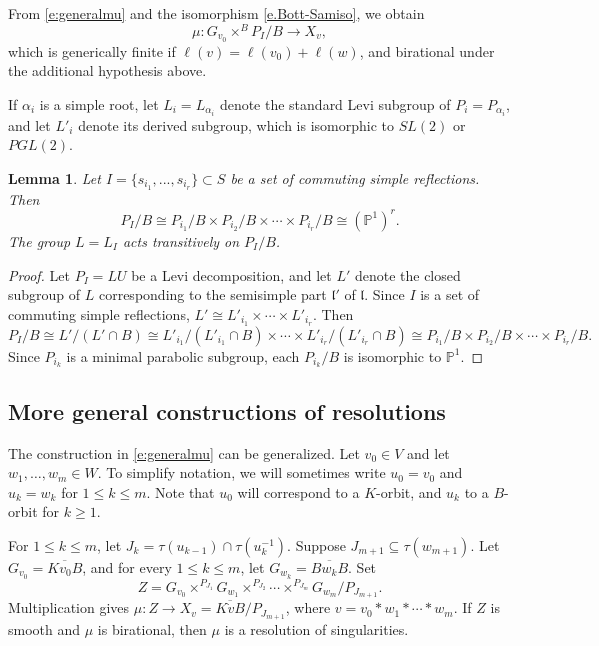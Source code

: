 \documentclass[11pt,letterpaper,reqno]{amsart}
\newcommand{\fl}{{\mathfrak l}}
\numberwithin{equation}{section}
\theoremstyle{plain}
\newtheorem{lemma}[theorem]{Lemma}
\theoremstyle{definition}
\theoremstyle{remark}
\begin{document}
 From \eqref{e:generalmu} and the isomorphism \eqref{e.Bott-Samiso}, we obtain
\begin{equation} \label{e:morphism3}
\mu: G_{v_0} \times^B P_I/B \to X_v,
\end{equation}
which is generically finite if $\ell(v) = \ell(v_0) + \ell(w)$, and birational under the additional hypothesis above.

If $\alpha_i$ is a simple root,
let $L_i = L_{\alpha_i}$ denote the standard Levi subgroup of $P_i = P_{\alpha_i}$, and let
$L'_i$ denote its derived subgroup, which is isomorphic to $SL(2)$ or $PGL(2)$.

\begin{lemma}\label{l:commutingsimple}
Let $I = \{s_{i_1} , . . . , s_{i_r}\} \subset S$ be a set of commuting simple reflections. 
Then
$$
P_I/B \cong P_{i_1}/B \times P_{i_2}/B \times \cdots \times P_{i_r}/B \cong(\mathbb{P}^1)^r.
$$
The group $L = L_I$
acts transitively on $P_I/B$.
\end{lemma}
\begin{proof}
Let $P_I = LU$ be a Levi decomposition, and let $L'$ denote the closed subgroup of $L$ corresponding to the semisimple
part $\fl'$ of $\fl$.  Since $I$ is a set of commuting simple reflections, $L' \cong L'_{i_1} \times \cdots \times L'_{i_r}$.  Then
$$
P_I /B \cong L'/(L' \cap B) \cong L'_{i_1}/(L'_{i_1} \cap B) \times \cdots \times L'_{i_r}/(L'_{i_r} \cap B) \cong P_{i_1}/B \times P_{i_2}/B \times \cdots \times P_{i_r}/B.
$$
Since $P_{i_k}$ is a minimal parabolic subgroup, each $P_{i_k}/B$ is isomorphic to $\mathbb{P}^1$.  
\end{proof}

\subsection{More general constructions of resolutions} \label{ss:moregeneral}
The construction in \eqref{e:generalmu} can be generalized.  
Let \(v_0\in V\) and let \(w_1,\ldots,w_m\in W\).  To simplify notation, we will sometimes
write $u_0 = v_0$ and $u_k = w_k$ for $1 \leq k \leq m$.  Note that
$u_0$ will correspond to a $K$-orbit, and $u_k$ to a $B$-orbit for $k \geq 1$. 

For \(1 \leq k\leq m\), let
\(J_k=\tau(u_{k-1})\cap\tau(u_{k}^{-1})\).
Suppose \(J_{m+1}\subseteq\tau(w_{m+1})\).
Let
$G_{v_0} = \overline{K v_0 B}$, and
for every $1\leq k\leq m$,  let
$G_{w_k} = \overline{Bw_kB}$.
Set 
\begin{equation}\label{e:generalZ}
Z=G_{v_0}\times^{P_{J_1}} G_{w_1}\times^{P_{J_2}}\cdots\times^{P_{J_m}}G_{w_m}/P_{J_{m+1}}.
\end{equation}
Multiplication gives $\mu: Z \to X_v = \overline{K \dot{v }B}/P_{J_{m+1}}$, where
$v = v_0*w_1 * \cdots * w_m$.  If $Z$ is smooth and $\mu$ is birational, then
$\mu$ is a resolution of singularities.  
\end{document}
